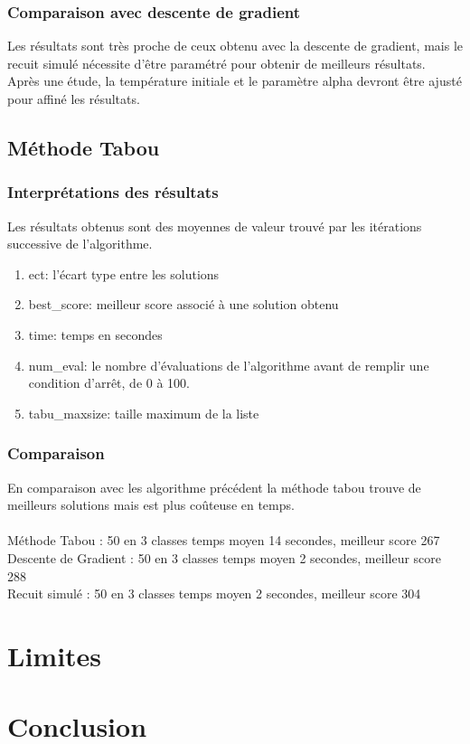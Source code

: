 \documentclass[a4paper]{article}
\begin{document}
		\subsubsection{Comparaison avec descente de gradient}
			Les résultats sont très proche de ceux obtenu avec la descente de gradient, mais le recuit simulé nécessite d’être paramétré pour obtenir de meilleurs résultats.\\
			Après une étude, la température initiale et le paramètre alpha devront être ajusté pour affiné les résultats.

	\subsection{Méthode Tabou}
		\subsubsection{Interprétations des résultats}
			Les résultats obtenus sont des moyennes de valeur trouvé par les itérations successive de l'algorithme.\\
			\begin{enumerate}
				\item{ect}: l'écart type entre les solutions
				\item{best\_score}: meilleur score associé à une solution obtenu
				\item{time}: temps en secondes
				\item{num\_eval}: le nombre d'évaluations de l'algorithme avant de remplir une condition d'arrêt, de 0 à 100.
				\item{tabu_maxsize}: taille maximum de la liste
			\end{enumerate}

		\subsubsection{Comparaison}
		 En comparaison avec les algorithme précédent la méthode tabou trouve de meilleurs solutions mais est plus coûteuse en temps.\\\\
		 Méthode Tabou : 50 en 3 classes temps moyen 14 secondes, meilleur score 267\\
		 Descente de Gradient : 50 en 3 classes temps moyen 2 secondes, meilleur score 288\\
		 Recuit simulé : 50 en 3 classes temps moyen 2 secondes, meilleur score 304\\

\section{Limites}

\section{Conclusion}
\end{document}
